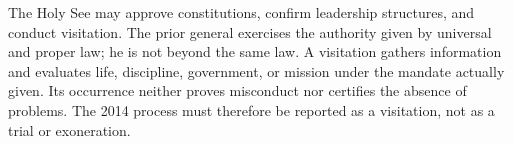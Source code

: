 The Holy See may approve constitutions, confirm leadership structures, and conduct visitation. The prior general exercises the authority given by universal and proper law; he is not beyond the same law. A visitation gathers information and evaluates life, discipline, government, or mission under the mandate actually given. Its occurrence neither proves misconduct nor certifies the absence of problems. The 2014 process must therefore be reported as a visitation, not as a trial or exoneration.

